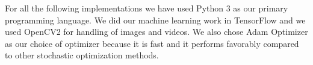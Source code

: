 For all the following implementations we have used Python 3 as our primary programming language. We did our machine learning work in TensorFlow and we used OpenCV2 for handling of images and videos. We also chose Adam Optimizer as our choice of optimizer because it is fast and it performs favorably compared to other stochastic optimization methods. 